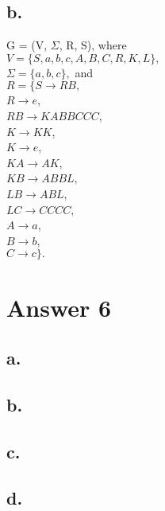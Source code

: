 \documentclass[12pt]{article}
\begin{document}
\subsection*{b.}
G  = (V, $\Sigma$, R, S), where \\
$V = \{S,a,b,c,A,B,C,R,K,L\},$\\
$\Sigma = \{a,b,c\},$ and \\
$R=\{S \rightarrow RB,$\\
$R \rightarrow e$, \\
$RB \rightarrow KABBCCC$,\\
$K \rightarrow KK$,\\
$K \rightarrow e$,\\
$KA \rightarrow  AK$,\\
$KB \rightarrow  ABBL$,\\
$LB \rightarrow ABL$,\\
$LC \rightarrow CCCC$,\\
$A \rightarrow a$,\\
$B \rightarrow b$,\\
$C \rightarrow c\}.$\\



\section*{Answer 6}

\subsection*{a.}

\subsection*{b.}

\subsection*{c.}

\subsection*{d.}


\end{document}
